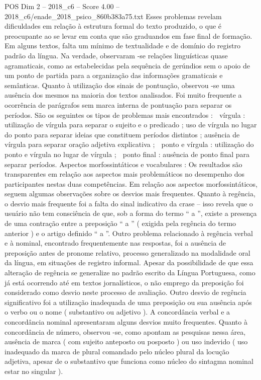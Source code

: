\begin{textsample}{POS Dim 2 – 2018\_c6 – Score 4.00 – 2018\_c6/enade\_2018\_psico\_860b383a75.txt}
Esses problemas revelam dificuldades em relação à estrutura formal do texto produzido, o que é preocupante ao se levar em conta que são graduandos em fase final de formação.
Em alguns textos, falta um mínimo de textualidade e de domínio do registro padrão da língua.
Na verdade, observaram -se relações linguísticas quase agramaticais, como as estabelecidas pela sequência de gerúndios sem o apoio de um ponto de partida para a organização das informações gramaticais e semânticas.
Quanto à utilização dos sinais de pontuação, observou -se uma ausência dos mesmos na maioria dos textos analisados.
Foi muito frequente a ocorrência de parágrafos sem marca interna de pontuação para separar os períodos.
São os seguintes os tipos de problemas mais encontrados :  vírgula : utilização de vírgula para separar o sujeito e o predicado ; uso de vírgula no lugar do ponto para separar ideias que constituem períodos distintos ; ausência de vírgula para separar oração adjetiva explicativa ;  ponto e vírgula : utilização do ponto e vírgula no lugar de vírgula ;  ponto final : ausência de ponto final para separar períodos.
Aspectos morfossintáticos e vocabulares : Os resultados são transparentes em relação aos aspectos mais problemáticos no desempenho dos participantes nestas duas competências.
Em relação aos aspectos morfossintáticos, seguem algumas observações sobre os desvios mais frequentes.
Quanto à regência, o desvio mais frequente foi a falta do sinal indicativo da crase – isso revela que o usuário não tem consciência de que, sob a forma do termo “ a ”, existe a presença de uma contração entre a preposição “ a ” ( exigida pela regência do termo anterior ) e o artigo definido “ a ”.
Outro problema relacionado à regência verbal e à nominal, encontrado frequentemente nas respostas, foi a ausência de preposição antes de pronome relativo, processo generalizado na modalidade oral da língua, em situações de registro informal.
Apesar da possibilidade de que essa alteração de regência se generalize no padrão escrito da Língua Portuguesa, como já está ocorrendo até em textos jornalísticos, o não emprego da preposição foi considerado como desvio neste processo de avaliação.
Outro desvio de regência significativo foi a utilização inadequada de uma preposição ou sua ausência após o verbo ou o nome ( substantivo ou adjetivo ).
A concordância verbal e a concordância nominal apresentaram alguns desvios muito frequentes.
Quanto à concordância de número, observou -se, como apontam as pesquisas nessa área, ausência de marca ( com sujeito anteposto ou posposto ) ou uso indevido ( uso inadequado da marca de plural comandado pelo núcleo plural da locução adjetiva, apesar de o substantivo que funciona como núcleo do sintagma nominal estar no singular ).

\end{textsample}
